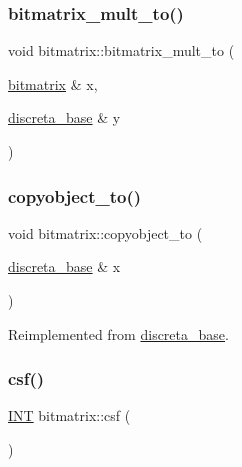 \subsubsection{\texorpdfstring{bitmatrix\+\_\+mult\+\_\+to()}{bitmatrix\_mult\_to()}}
{\footnotesize\ttfamily void bitmatrix\+::bitmatrix\+\_\+mult\+\_\+to (\begin{DoxyParamCaption}\item[{\mbox{\hyperlink{classbitmatrix}{bitmatrix}} \&}]{x,  }\item[{\mbox{\hyperlink{classdiscreta__base}{discreta\+\_\+base}} \&}]{y }\end{DoxyParamCaption})}

\mbox{\label{classbitmatrix_ac97adfe8348d9fe6ef19447b7611bbea}} 
\subsubsection{\texorpdfstring{copyobject\+\_\+to()}{copyobject\_to()}}
{\footnotesize\ttfamily void bitmatrix\+::copyobject\+\_\+to (\begin{DoxyParamCaption}\item[{\mbox{\hyperlink{classdiscreta__base}{discreta\+\_\+base}} \&}]{x }\end{DoxyParamCaption})\hspace{0.3cm}{\ttfamily [virtual]}}



Reimplemented from \mbox{\hyperlink{classdiscreta__base_a33180628d9ced231267229b3564790f3}{discreta\+\_\+base}}.

\mbox{\label{classbitmatrix_a2d11a854ea302b0e6fa61c9c6607deaf}} 
\subsubsection{\texorpdfstring{csf()}{csf()}}
{\footnotesize\ttfamily \mbox{\hyperlink{galois_8h_a09fddde158a3a20bd2dcadb609de11dc}{I\+NT}} bitmatrix\+::csf (\begin{DoxyParamCaption}{ }\end{DoxyParamCaption})}

\mbox{\label{classbitmatrix_a4b84eed56a244df63819eae6b7ba1eff}} 
